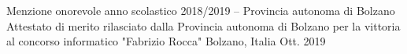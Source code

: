 

\begin{cvhonors}

  \cvhonor
    {Menzione onorevole anno scolastico 2018/2019 – Provincia autonoma di Bolzano} %
    {Attestato di merito rilasciato dalla Provincia autonoma di Bolzano per la vittoria al concorso informatico "Fabrizio Rocca"} %
    {Bolzano, Italia} %
    {Ott. 2019} %

\end{cvhonors}
